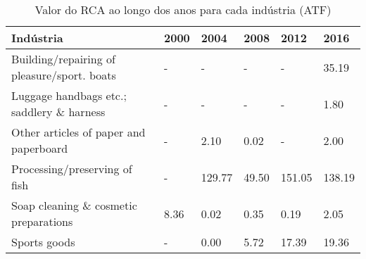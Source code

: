 \begin{table}
\centering
\caption{Valor do RCA ao longo dos anos para cada indústria (ATF)}
\begin{tabular}{p{6cm}p{1.5cm}p{1.5cm}p{1.5cm}p{1.5cm}p{1.5cm}}
\toprule
                                  Indústria & 2000 &   2004 &  2008 &   2012 &   2016 \\
\midrule
Building/repairing of pleasure/sport. boats &    - &      - &     - &      - &  35.19 \\
  Luggage handbags etc.; saddlery \& harness &    - &      - &     - &      - &   1.80 \\
     Other articles of paper and paperboard &    - &   2.10 &  0.02 &      - &   2.00 \\
              Processing/preserving of fish &    - & 129.77 & 49.50 & 151.05 & 138.19 \\
      Soap cleaning \& cosmetic preparations & 8.36 &   0.02 &  0.35 &   0.19 &   2.05 \\
                               Sports goods &    - &   0.00 &  5.72 &  17.39 &  19.36 \\
\bottomrule
\end{tabular}
\end{table}
